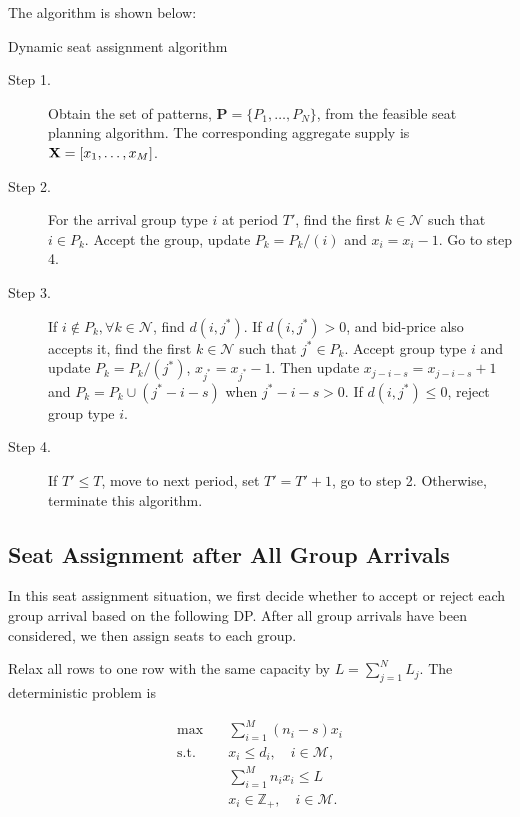 The algorithm is shown below:

\begin{algorithm}[H]
  \caption{Dynamic seat assignment algorithm}\label{algo_dynamic_policy}
  \begin{description}
    \item[Step 1.] Obtain the set of patterns, $\mathbf{P} = \{P_1,\ldots,P_{N}\}$, from the feasible seat planning algorithm. The corresponding aggregate supply is $\mathbf{X} = [x_{1}, \ldots, x_{M}]$.
    \item[Step 2.] For the arrival group type $i$ at period $T{'}$, find the first $k \in \mathcal{N}$ such that $i \in P_k$. Accept the group, update $P_{k} = P_{k}/(i)$ and $x_{i} = x_{i} -1$. Go to step 4.
    \item[Step 3.] If $i \notin P_k, \forall k \in \mathcal{N}$, find $d(i,j^{*})$. If $d(i,j^{*})>0$, and bid-price also accepts it, find the first $k \in \mathcal{N}$ such that $j^{*} \in P_k$. Accept group type $i$ and update $P_{k} = P_{k}/(j^{*})$, $x_{j^{*}} = x_{j^{*}} -1$. Then update $x_{j-i-s} = x_{j-i-s} + 1$ and $P_{k}= P_{k} \cup (j^{*}-i-s)$ when $j^{*}-i-s > 0$. If $d(i,j^{*}) \leq 0$, reject group type $i$.
    \item[Step 4.] If $T{'} \leq T$, move to next period, set $T{'} = T{'}+1$, go to step 2. Otherwise, terminate this algorithm.
  \end{description}
\end{algorithm}


\subsection{Seat Assignment after All Group Arrivals}
In this seat assignment situation, we first decide whether to accept or reject each group arrival based on the following DP. After all group arrivals have been considered, we then assign seats to each group.

Relax all rows to one row with the same capacity by $L = \sum_{j=1}^{N} L_j$. The deterministic problem is

\begin{equation}\label{relax_deter}
  \begin{aligned}
  \max \quad & \sum_{i=1}^{M} (n_i- s) x_{i} \\
  \text {s.t.} \quad & x_{i} \leq d_{i}, \quad i \in \mathcal{M}, \\
  & \sum_{i=1}^{M} n_{i} x_{i} \leq L \\
  & x_{i} \in \mathbb{Z}_{+}, \quad i \in \mathcal{M}.
  \end{aligned}
\end{equation}

